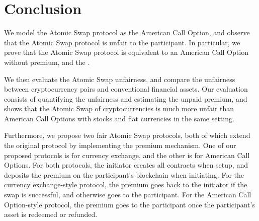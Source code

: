 \section{Conclusion}
\label{sec:conclusion}


We model the Atomic Swap protocol as the American Call Option,
and observe that the Atomic Swap protocol is unfair to the participant.
In particular, we prove that the Atomic Swap protocol is equivalent to an American Call Option without  premium,
and the .

We then evaluate the Atomic Swap unfairness, and compare the unfairness between cryptocurrency pairs and conventional financial assets.
Our evaluation consists of quantifying the unfairness and estimating the unpaid premium,
and shows that the Atomic Swap of cryptocurrencies is much more unfair than American Call Options with stocks and fiat currencies in the same setting.

Furthermore, we propose two fair Atomic Swap protocols, both of which extend the original protocol by implementing the premium mechanism.
One of our proposed protocols is for currency exchange, and the other is for American Call Options.
For both protocols, the initiator creates all contracts when setup, and deposits the premium on the participant's blockchain when initiating.
For the currency exchange-style protocol, the premium goes back to the initiator if the swap is successful, and otherwise goes to the participant.
For the American Call Option-style protocol, the premium goes to the participant once the participant's asset is redeemed or refunded.